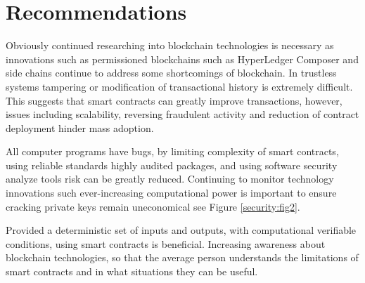  \section{Recommendations}
 
 
  
Obviously continued researching into \gls{blockchain} technologies is necessary as innovations such as permissioned blockchains such as \gls{HyperLedger Composer} and \gls{side chains} continue to address some shortcomings of blockchain. In trustless systems tampering or modification of transactional history is extremely difficult. This suggests that smart contracts can greatly improve transactions, however, issues including scalability, reversing fraudulent activity and reduction of contract deployment hinder mass adoption.

All computer programs have bugs, by limiting complexity of smart contracts,  using reliable standards highly audited packages, and using software security analyze tools risk can be greatly reduced. Continuing to monitor technology innovations such ever-increasing computational power is important to ensure cracking private keys remain uneconomical see Figure \ref{security:fig2}.

Provided a deterministic set of inputs and outputs, with computational verifiable conditions, using smart contracts is beneficial.
Increasing awareness about \gls{blockchain} technologies, so that the average person understands the limitations of smart contracts and in what situations they can be useful.

\newpage